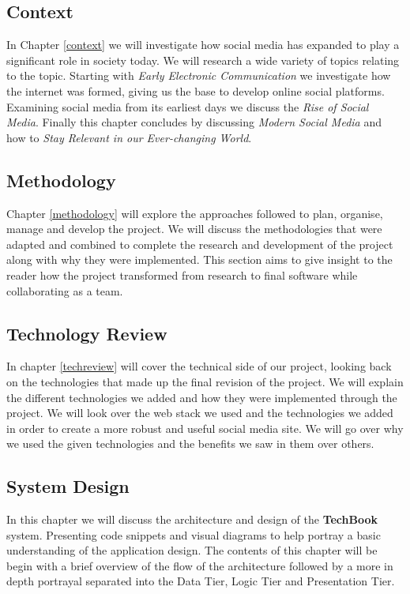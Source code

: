 \subsection{Context}
In Chapter \ref{context} we will investigate how social media has expanded to play a significant role in society today. We will research a wide variety of topics relating to the topic. Starting with \textit{Early Electronic Communication} we investigate how the internet was formed, giving us the base to develop online social platforms. Examining social media from its earliest days we discuss the \textit{Rise of Social Media}. Finally this chapter concludes by discussing \textit{Modern Social Media} and how to \textit{Stay Relevant in our Ever-changing World}.

\subsection{Methodology}
Chapter \ref{methodology} will explore the approaches followed to plan, organise, manage and develop the project. We will discuss the methodologies that were adapted and combined to complete the research and development of the project along with why they were implemented. This section aims to give insight to the reader how the project transformed from research to final software while collaborating as a team.

\subsection{Technology Review}
In chapter \ref{techreview} will cover the technical side of our project, looking back on the technologies that made up the final revision of the project. We will explain the different technologies we added and how they were implemented through the project. We will look over the web stack we used and the technologies we added in order to create a more robust and useful social media site. We will go over why we used the given technologies and the benefits we saw in them over others.

\subsection{System Design}
In this chapter we will discuss the architecture and design of the \textbf{TechBook} system. Presenting code snippets and visual diagrams to help portray a basic understanding of the application design. The contents of this chapter will be begin with a brief overview of the flow of the architecture followed by a more in depth portrayal separated into the Data Tier, Logic Tier and Presentation Tier.

